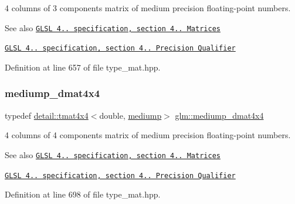 4 columns of 3 components matrix of medium precision floating-\/point numbers.

\begin{DoxySeeAlso}{See also}
\href{http://www.opengl.org/registry/doc/GLSLangSpec.4.20.8.pdf}{\tt G\+L\+SL 4.. specification, section 4.. Matrices} 

\href{http://www.opengl.org/registry/doc/GLSLangSpec.4.20.8.pdf}{\tt G\+L\+SL 4.. specification, section 4.. Precision Qualifier} 
\end{DoxySeeAlso}


Definition at line 657 of file type\+\_\+mat.\+hpp.

\mbox{\label{group__core__precision_gad64329d45b05417ccf0cc3c23f584d26}} 
\subsubsection{\texorpdfstring{mediump\+\_\+dmat4x4}{mediump\_dmat4x4}}
{\footnotesize\ttfamily typedef \hyperlink{structglm_1_1detail_1_1tmat4x4}{detail\+::tmat4x4}$<$double, \hyperlink{namespaceglm_a0f04f086094c747d227af4425893f545a6416f3ea0c9025fb21ed50c4d6620482}{mediump}$>$ \hyperlink{group__core__precision_gad64329d45b05417ccf0cc3c23f584d26}{glm\+::mediump\+\_\+dmat4x4}}

4 columns of 4 components matrix of medium precision floating-\/point numbers.

\begin{DoxySeeAlso}{See also}
\href{http://www.opengl.org/registry/doc/GLSLangSpec.4.20.8.pdf}{\tt G\+L\+SL 4.. specification, section 4.. Matrices} 

\href{http://www.opengl.org/registry/doc/GLSLangSpec.4.20.8.pdf}{\tt G\+L\+SL 4.. specification, section 4.. Precision Qualifier} 
\end{DoxySeeAlso}


Definition at line 698 of file type\+\_\+mat.\+hpp.

\mbox{\label{group__core__precision_gace1f1cc2eb8e978dcb60e682af87b541}} 
